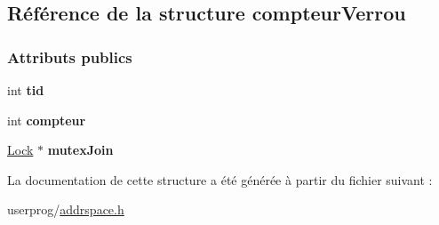\hypertarget{structcompteur_verrou}{}\subsection{Référence de la structure compteur\+Verrou}
\label{structcompteur_verrou}
\subsubsection*{Attributs publics}
\begin{DoxyCompactItemize}
\item 
\hypertarget{structcompteur_verrou_adb91e0431faab9c660cf62e3ce17b7ff}{}\label{structcompteur_verrou_adb91e0431faab9c660cf62e3ce17b7ff} 
int {\bfseries tid}
\item 
\hypertarget{structcompteur_verrou_a21fc61d1bb837aa0ca57a28987110540}{}\label{structcompteur_verrou_a21fc61d1bb837aa0ca57a28987110540} 
int {\bfseries compteur}
\item 
\hypertarget{structcompteur_verrou_aafec44eb108991e6abd23fcee26e88cf}{}\label{structcompteur_verrou_aafec44eb108991e6abd23fcee26e88cf} 
\hyperlink{class_lock}{Lock} $\ast$ {\bfseries mutex\+Join}
\end{DoxyCompactItemize}


La documentation de cette structure a été générée à partir du fichier suivant \+:\begin{DoxyCompactItemize}
\item 
userprog/\hyperlink{addrspace_8h}{addrspace.\+h}\end{DoxyCompactItemize}
